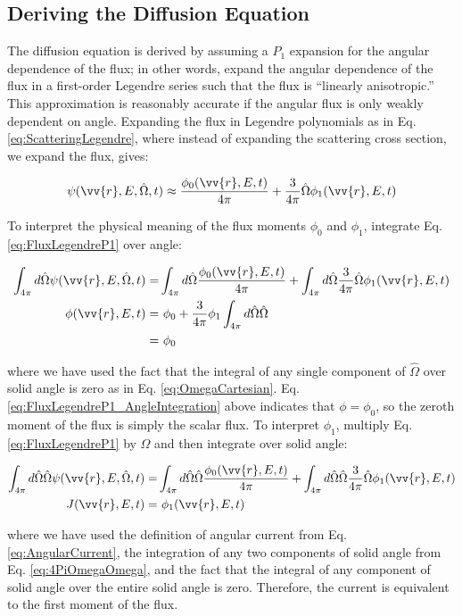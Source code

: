 \documentclass[10pt]{article}
\newcommand{\beq}{\begin{equation}}
\newcommand{\eeq}{\end{equation}}
\newcommand{\beqa}{\begin{equation}\begin{aligned}}
\newcommand{\eeqa}{\end{aligned}\end{equation}}
\newcommand{\hO}{\hat{\Omega}}
\newcommand{\spa}{(\vv{r}, E, \hO, t)}
\newcommand{\spas}{(\vv{r},E,t)}
\begin{document}
\begin{flushleft}
\clearpage
\section{Deriving the Diffusion Equation}

The diffusion equation is derived by assuming a \(P_1\) expansion for the angular dependence of the flux; in other words, expand the angular dependence of the flux in a first-order Legendre series such that the flux is ``linearly anisotropic.'' This approximation is reasonably accurate if the angular flux is only weakly dependent on angle. Expanding the flux in Legendre polynomials as in Eq. \ref{eq:ScatteringLegendre}, where instead of expanding the scattering cross section, we expand the flux, gives:

\beq
\label{eq:FluxLegendreP1}
\psi\spa  \approx \frac{\phi_0\spas}{4\pi} + \frac{3}{4\pi} \hO  \phi_1\spas
\eeq

To interpret the physical meaning of the flux moments \(\phi_0\) and \(\phi_1\), integrate Eq. \ref{eq:FluxLegendreP1} over angle:

\beqa
\label{eq:FluxLegendreP1_AngleIntegration}
\int_{4\pi}^{} d\hO   \psi\spa  =& \int_{4\pi}^{} d\hO   \frac{\phi_0\spas}{4\pi} + \int_{4\pi}^{} d\hO   \frac{3}{4\pi} \hO  \phi_1\spas\\
\phi\spas = &\ \phi_0 + \frac{3}{4\pi}\phi_1\int_{4\pi}^{} d\hO  \hO\\
   = &\ \phi_0
\eeqa

where we have used the fact that the integral of any single component of \(\hO\) over solid angle is zero as in Eq. \ref{eq:OmegaCartesian}. Eq. \ref{eq:FluxLegendreP1_AngleIntegration} above indicates that \(\phi = \phi_0\), so the zeroth moment of the flux is simply the scalar flux. To interpret \(\phi_1\), multiply Eq. \ref{eq:FluxLegendreP1} by \(\hO\) and then integrate over solid angle:

\beqa
\label{eq:FluxLegendreP1_AngleIntegration2}
\int_{4\pi}^{} d\hO   \hO  \psi\spa  =& \int_{4\pi}^{} d\hO   \hO  \frac{\phi_0\spas}{4\pi} + \int_{4\pi}^{} d\hO   \hO  \frac{3}{4\pi} \hO  \phi_1\spas\\
J\spas = &\ \phi_1\spas\\
\eeqa

where we have used the definition of angular current from Eq. \ref{eq:AngularCurrent}, the integration of any two components of solid angle from Eq. \ref{eq:4PiOmegaOmega}, and the fact that the integral of any component of solid angle over the entire solid angle is zero. Therefore, the current is equivalent to the first moment of the flux.


\end{flushleft}
\end{document}
